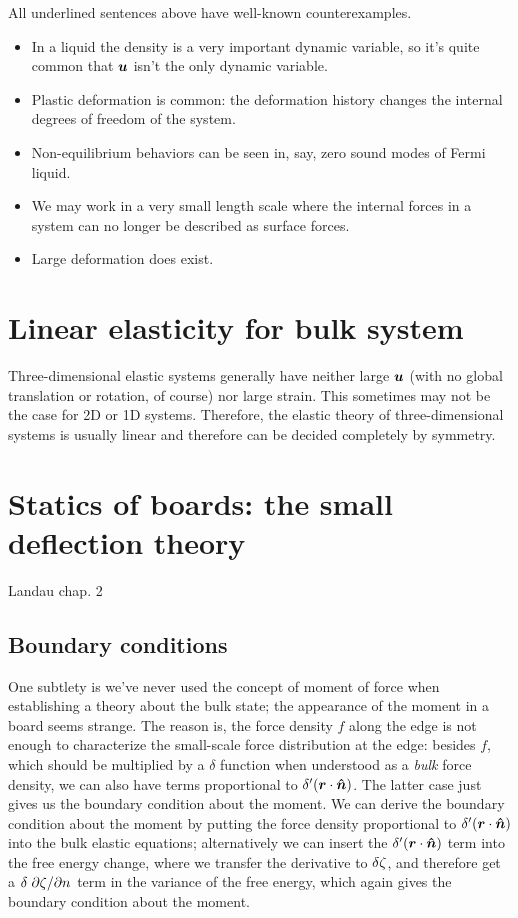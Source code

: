 \documentclass[hyperref, a4paper]{article}
\begin{document}
All underlined sentences above have well-known counterexamples.
\begin{itemize}
    \item In a liquid the density is a very important dynamic variable,
    so it's quite common that $\vb*{u}$ isn't the only dynamic variable.
    \item Plastic deformation is common: 
    the deformation history changes the internal degrees of freedom of the system. 
    \item Non-equilibrium behaviors can be seen in, say, 
    zero sound modes of Fermi liquid.
    \item We may work in a very small length scale 
    where the internal forces in a system can no longer be described 
    as surface forces.
    \item Large deformation does exist.
\end{itemize}

\section{Linear elasticity for bulk system}

Three-dimensional elastic systems 
generally have neither large $\vb*{u}$ (with no global translation or rotation, of course)
nor large strain.
This sometimes may not be the case for 2D or 1D systems.
Therefore, the elastic theory of three-dimensional systems 
is usually linear and therefore can be decided completely by symmetry.


\section{Statics of boards: the small deflection theory}

Landau chap. 2

\subsection{Boundary conditions}

One subtlety is we've never used the concept of moment of force
when establishing a theory about the bulk state; 
the appearance of the moment in a board seems strange. 
The reason is, the force density $f$ along the edge 
is not enough to characterize the small-scale force distribution at the edge: 
besides $f$, which should be multiplied by a $\delta$ function 
when understood as a \emph{bulk} force density, 
we can also have terms proportional to $\delta'(\vb*{r} \cdot \vu*{n})$.
The latter case just gives us the boundary condition about the moment.
We can derive the boundary condition about the moment 
by putting the force density proportional to $\delta'(\vb*{r} \cdot \vu*{n})$ 
into the bulk elastic equations; 
alternatively we can insert the $\delta'(\vb*{r} \cdot \vu*{n})$ term into the free energy change, 
where we transfer the derivative to $\var{\zeta}$,
and therefore get a $\var{\pdv*{\zeta}{n}}$ term 
in the variance of the free energy, 
which again gives the boundary condition about the moment.
\end{document}
